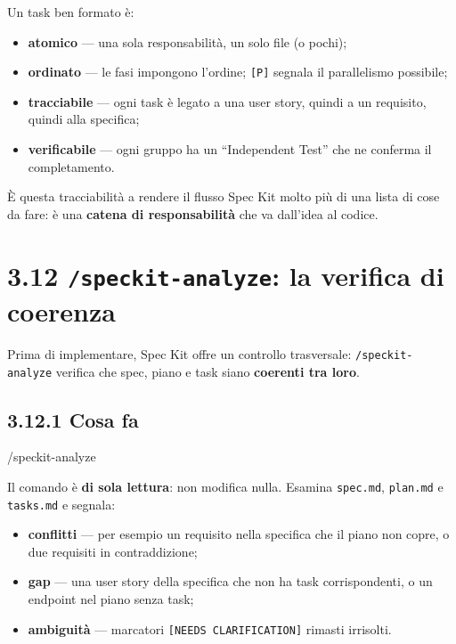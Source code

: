 \documentclass[
  italian,
  10pt,
]{book}
\newenvironment{Shaded}{\begin{snugshade}}{\end{snugshade}}
\newcommand{\NormalTok}[1]{#1}
\providecommand{\tightlist}{%
  \setlength{\itemsep}{0pt}\setlength{\parskip}{0pt}}
\begin{document}
Un task ben formato è:

\begin{itemize}
\tightlist
\item
  \textbf{atomico} --- una sola responsabilità, un solo file (o pochi);
\item
  \textbf{ordinato} --- le fasi impongono l'ordine; \texttt{{[}P{]}}
  segnala il parallelismo possibile;
\item
  \textbf{tracciabile} --- ogni task è legato a una user story, quindi a
  un requisito, quindi alla specifica;
\item
  \textbf{verificabile} --- ogni gruppo ha un ``Independent Test'' che
  ne conferma il completamento.
\end{itemize}

È questa tracciabilità a rendere il flusso Spec Kit molto più di una
lista di cose da fare: è una \textbf{catena di responsabilità} che va
dall'idea al codice.

\section{\texorpdfstring{3.12 \texttt{/speckit-analyze}: la verifica di
coerenza}{3.12 /speckit-analyze: la verifica di coerenza}}\label{speckit-analyze-la-verifica-di-coerenza}

Prima di implementare, Spec Kit offre un controllo trasversale:
\texttt{/speckit-analyze} verifica che spec, piano e task siano
\textbf{coerenti tra loro}.

\subsection{3.12.1 Cosa fa}\label{cosa-fa-2}

\begin{Shaded}
\begin{Highlighting}[]
\NormalTok{/speckit{-}analyze}
\end{Highlighting}
\end{Shaded}

Il comando è \textbf{di sola lettura}: non modifica nulla. Esamina
\texttt{spec.md}, \texttt{plan.md} e \texttt{tasks.md} e segnala:

\begin{itemize}
\tightlist
\item
  \textbf{conflitti} --- per esempio un requisito nella specifica che il
  piano non copre, o due requisiti in contraddizione;
\item
  \textbf{gap} --- una user story della specifica che non ha task
  corrispondenti, o un endpoint nel piano senza task;
\item
  \textbf{ambiguità} --- marcatori \texttt{{[}NEEDS\ CLARIFICATION{]}}
  rimasti irrisolti.
\end{itemize}
\end{document}
